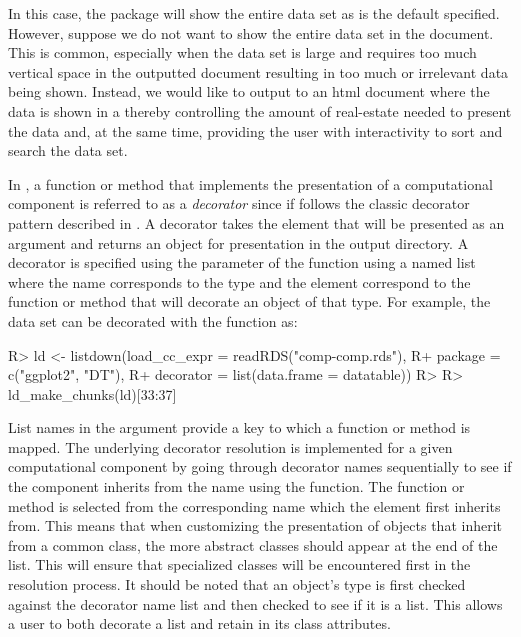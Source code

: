 \documentclass[
]{jss}
\begin{document}
In this case, the  package will show the entire data set
as is the default specified. However, suppose we do not want to show the
entire data set in the document. This is common, especially when the
data set is large and requires too much vertical space in the outputted
document resulting in too much or irrelevant data being shown. Instead,
we would like to output to an html document where the data is shown in a
 thereby controlling the amount of real-estate needed to
present the data and, at the same time, providing the user with
interactivity to sort and search the data set.

In , a function or method that implements the presentation
of a computational component is referred to as a \emph{decorator} since
if follows the classic decorator pattern described in \citet{gamma1995}.
A decorator takes the element that will be presented as an argument and
returns an object for presentation in the output directory. A decorator
is specified using the  parameter of the
 function using a named list where the name corresponds
to the type and the element correspond to the function or method that
will decorate an object of that type. For example, the 
data set can be decorated with the  function
\citep{xie2020} as:

\begin{CodeChunk}

\begin{CodeInput}
R> ld <- listdown(load_cc_expr = readRDS("comp-comp.rds"), 
R+                package = c("ggplot2", "DT"),
R+                decorator = list(data.frame = datatable))
R> 
R> ld_make_chunks(ld)[33:37]
\end{CodeInput}

\end{CodeChunk}

List names in the  argument provide a key to which a
function or method is mapped. The underlying decorator resolution is
implemented for a given computational component by going through
decorator names sequentially to see if the component inherits from the
name using the  function. The function or method is
selected from the corresponding name which the element first inherits
from. This means that when customizing the presentation of objects that
inherit from a common class, the more abstract classes should appear at
the end of the list. This will ensure that specialized classes will be
encountered first in the resolution process. It should be noted that an
object's type is first checked against the decorator name list and then
checked to see if it is a list. This allows a user to both decorate a
list and retain  in its class attributes.
\end{document}
